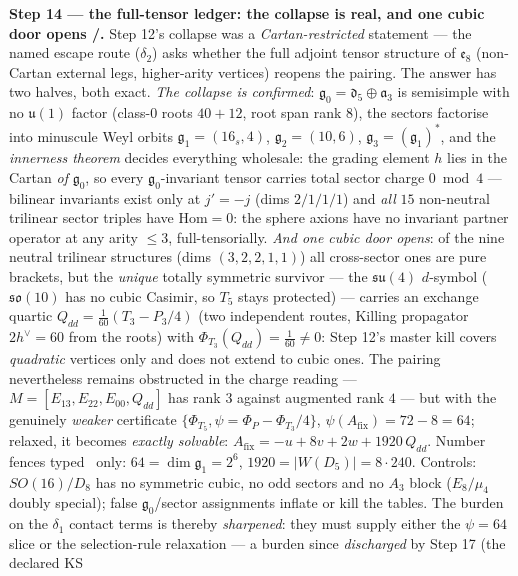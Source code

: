 \par\smallskip\noindent\textbf{Step 14 --- the full-tensor ledger: the collapse is real, and one
cubic door opens \mE/\mC.} Step 12's collapse was a \emph{Cartan-restricted} statement --- the
named escape route ($\delta_2$) asks whether the full adjoint tensor structure of $\mathfrak e_8$
(non-Cartan external legs, higher-arity vertices) reopens the pairing. The answer has two halves,
both exact. \emph{The collapse is confirmed}: $\mathfrak g_0=\mathfrak d_5\oplus\mathfrak a_3$ is
semisimple with no $\mathfrak u(1)$ factor (class-$0$ roots $40{+}12$, root span rank $8$), the
sectors factorise into minuscule Weyl orbits $\mathfrak g_1=(16_s,4)$, $\mathfrak g_2=(10,6)$,
$\mathfrak g_3=(\mathfrak g_1)^*$, and the \emph{innerness theorem} decides everything wholesale:
the grading element $h$ lies in the Cartan \emph{of} $\mathfrak g_0$, so every
$\mathfrak g_0$-invariant tensor carries total sector charge $0\bmod4$ --- bilinear invariants
exist only at $j'=-j$ (dims $2/1/1/1$) and \emph{all} $15$ non-neutral trilinear sector triples
have $\mathrm{Hom}=0$: the sphere axions have no invariant partner operator at any arity $\le3$,
full-tensorially. \emph{And one cubic door opens}: of the nine neutral trilinear structures
(dims $(3,2,2,1,1)$) all cross-sector ones are pure brackets, but the \emph{unique} totally
symmetric survivor --- the $\mathfrak{su}(4)$ $d$-symbol ($\mathfrak{so}(10)$ has no cubic
Casimir, so $T_5$ stays protected) --- carries an exchange quartic
$Q_{dd}=\tfrac1{60}(T_3-P_3/4)$ (two independent routes, Killing propagator $2h^\vee=60$ from the
roots) with $\Phi_{T_3}(Q_{dd})=\tfrac1{60}\neq0$: Step 12's master kill covers \emph{quadratic}
vertices only and does not extend to cubic ones. The pairing nevertheless remains obstructed in
the charge reading --- $M=[E_{13},E_{22},E_{00},Q_{dd}]$ has rank $3$ against augmented rank $4$
--- but with the genuinely \emph{weaker} certificate $\{\Phi_{T_5},\psi=\Phi_P-\Phi_{T_3}/4\}$,
$\psi(A_{\mathrm{fix}})=72-8=64$; relaxed, it becomes \emph{exactly solvable}:
$A_{\mathrm{fix}}=-u+8v+2w+1920\,Q_{dd}$. Number fences typed \mC\ only:
$64=\dim\mathfrak g_1=2^6$, $1920=|W(D_5)|=8\cdot240$. Controls: $SO(16)/D_8$ has no symmetric
cubic, no odd sectors and no $A_3$ block ($E_8/\mu_4$ doubly special); false
$\mathfrak g_0$/sector assignments inflate or kill the tables. The burden on the $\delta_1$
contact terms is thereby \emph{sharpened}: they must supply either the $\psi=64$ slice or the
selection-rule relaxation --- a burden since \emph{discharged} by Step 17 (the declared KS
